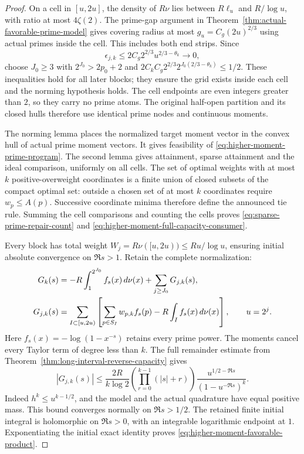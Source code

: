 \documentclass[11pt]{article}
\theoremstyle{definition}
\begin{document}
\begin{proof}
On a cell in $[u,2u]$, the density of $R\nu$ lies between
$R\ell_u$ and $R/\log u$, with ratio at most $4\zeta(2)$.
The prime-gap argument in
Theorem~\ref{thm:actual-favorable-prime-model} gives covering
radius at most $g_u=C_g(2u)^{2/3}$ using actual primes inside
the cell. This includes both end strips. Since
\[
 \epsilon_{j,k}\le2C_g2^{2/3}u^{2/3-\theta_k}\longrightarrow0,
\]
choose $J_0\ge3$ with $2^{J_0}>2p_0+2$ and
$2C_kC_g2^{2/3}2^{J_0(2/3-\theta_k)}\le1/2$.
These inequalities hold for all later blocks; they ensure
the grid exists inside each cell and the norming hypothesis
holds. The cell endpoints are even integers greater than
$2$, so they carry no prime atoms. The original half-open
partition and its closed hulls therefore use identical
prime nodes and continuous moments.

The norming lemma places the normalized target moment vector
in the convex hull of actual prime moment vectors. It gives
feasibility of \eqref{eq:higher-moment-prime-program}.
The second lemma gives attainment, sparse attainment and the
ideal comparison, uniformly on all cells. The set of optimal
weights with at most $k$ positive-overweight coordinates is
a finite union of closed subsets of the compact optimal set:
outside a chosen set of at most $k$ coordinates require
$w_p\le A(p)$. Successive coordinate minima therefore define
the announced tie rule. Summing the cell comparisons and
counting the cells proves
\eqref{eq:sparse-prime-repair-count} and
\eqref{eq:higher-moment-full-capacity-consumer}.

Every block has total weight
$W_j=R\nu([u,2u))\le Ru/\log u$, ensuring initial absolute
convergence on $\Re s>1$. Retain the complete normalization:
\begin{align}
 G_k(s)&=-R\int_1^{2^{J_0}}f_s(x)\,d\nu(x)
                                      +\sum_{j\ge J_0}G_{j,k}(s),\notag\\
 G_{j,k}(s)&=\sum_{I\subset[u,2u)}
    \left[\sum_{p\in S_I}w_{p,k}f_s(p)
                          -R\int_I f_s(x)\,d\nu(x)\right],
 \qquad u=2^j .
 \label{eq:higher-moment-complete-logarithm}
\end{align}
Here $f_s(x)=-\log(1-x^{-s})$ retains every prime power.
The moments cancel every Taylor term of degree less than
$k$. The full remainder estimate from
Theorem~\ref{thm:long-interval-reverse-capacity} gives
\begin{equation}
 |G_{j,k}(s)|\le
 \frac{2R}{k\log2}
       \left(\prod_{r=0}^{k-1}(|s|+r)\right)
       \frac{u^{1/2-\Re s}}{(1-u^{-\Re s})^k}.
 \label{eq:higher-moment-prime-error}
\end{equation}
Indeed $h^k\le u^{k-1/2}$, and the model and the actual
quadrature have equal positive mass. This bound converges
normally on $\Re s>1/2$. The retained finite initial integral
is holomorphic on $\Re s>0$, with an integrable logarithmic
endpoint at $1$. Exponentiating the initial exact identity
proves \eqref{eq:higher-moment-favorable-product}.


\end{proof}
\end{document}
